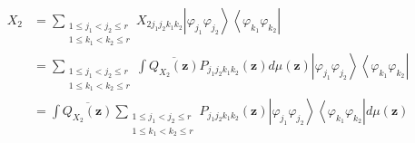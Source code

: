 \documentclass[aps,preprint]{revtex4}%
\begin{document}
\begin{align}
X_{2}  &  =\sum_{\substack{1\leq j_{1}<j_{2}\leq r\\1\leq k_{1}<k_{2}\leq
r}}X_{2j_{1}j_{2}k_{1}k_{2}}\left\vert \varphi_{j_{1}}\varphi_{j_{2}%
}\right\rangle \left\langle \varphi_{k_{1}}\varphi_{k_{2}}\right\vert
\nonumber\\
&  =\sum_{\substack{1\leq j_{1}<j_{2}\leq r\\1\leq k_{1}<k_{2}\leq r}%
}\int\overline{Q_{X_{2}}\left(  \mathbf{z}\right)  }P_{j_{1}j_{2}k_{1}k_{2}%
}\left(  \mathbf{z}\right)  d\mu\left(  \mathbf{z}\right)  \left\vert
\varphi_{j_{1}}\varphi_{j_{2}}\right\rangle \left\langle \varphi_{k_{1}%
}\varphi_{k_{2}}\right\vert \nonumber\\
&  =\int\overline{Q_{X_{2}}\left(  \mathbf{z}\right)  }\sum_{\substack{1\leq
j_{1}<j_{2}\leq r\\1\leq k_{1}<k_{2}\leq r}}P_{j_{1}j_{2}k_{1}k_{2}}\left(
\mathbf{z}\right)  \left\vert \varphi_{j_{1}}\varphi_{j_{2}}\right\rangle
\left\langle \varphi_{k_{1}}\varphi_{k_{2}}\right\vert d\mu\left(
\mathbf{z}\right)
\end{align}
\end{document}
